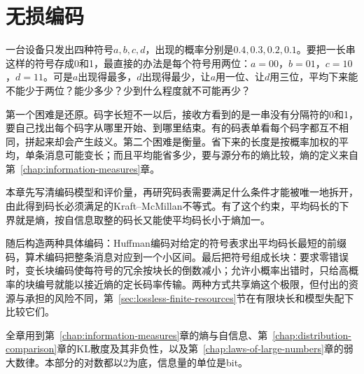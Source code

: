 \chapter{无损编码}
\label{chap:lossless-coding}

一台设备只发出四种符号$a,b,c,d$，出现的概率分别是$0.4,0.3,0.2,0.1$。要把一长串这样的符号存成0和1，最直接的办法是每个符号用两位：$a=00$，$b=01$，$c=10$，$d=11$。可是$a$出现得最多，$d$出现得最少，让$a$用一位、让$d$用三位，平均下来能不能少于两位？能少多少？少到什么程度就不可能再少？

第一个困难是还原。码字长短不一以后，接收方看到的是一串没有分隔符的0和1，要自己找出每个码字从哪里开始、到哪里结束。有的码表单看每个码字都互不相同，拼起来却会产生歧义。第二个困难是衡量。省下来的长度是按概率加权的平均，单条消息可能变长；而且平均能省多少，要与源分布的熵比较，熵的定义来自第~\ref{chap:information-measures}章。

本章先写清编码模型和评价量，再研究码表需要满足什么条件才能被唯一地拆开，由此得到码长必须满足的Kraft–McMillan不等式。有了这个约束，平均码长的下界就是熵，按自信息取整的码长又能使平均码长小于熵加一。

随后构造两种具体编码：Huffman编码对给定的符号表求出平均码长最短的前缀码，算术编码把整条消息对应到一个小区间。最后把符号组成长块：要求零错误时，变长块编码使每符号的冗余按块长的倒数减小；允许小概率出错时，只给高概率的块编号就能以接近熵的定长码率传输。两种方式共享熵这个极限，但付出的资源与承担的风险不同，第~\ref{sec:lossless-finite-resources}节在有限块长和模型失配下比较它们。

全章用到第~\ref{chap:information-measures}章的熵与自信息、第~\ref{chap:distribution-comparison}章的KL散度及其非负性，以及第~\ref{chap:laws-of-large-numbers}章的弱大数律。本部分的对数都以$2$为底，信息量的单位是bit。















